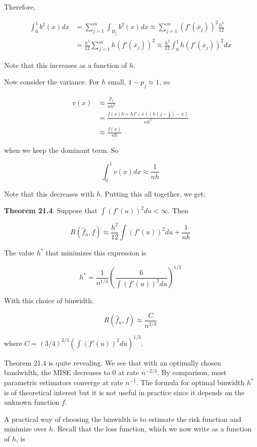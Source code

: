 Therefore,

\begin{align*}
\int_{0}^{1} b^{2}(x) dx &= \sum_{j=1}^m \int_{B_{j}} b^{2}(x) dx \approx \sum_{j=1}^m (f'(\overline{x}_{j}))^{2} \frac{h^{3}}{12} \\
&= \frac{h^{2}}{12} \sum_{j=1}^m h(f'(\overline{x}_{j}))^{2} \approx \frac{h^{2}}{12} \int_{0}^{1} h(f'(\overline{x}_{j}))^{2} dx
\end{align*}

Note that this increases as a function of \(h\).

Now consider the variance. For \(h\) small, \(1 - p_{j} \approx 1\), so

\begin{align*}
v(x) &\approx \frac{p_{j}}{nh^{2}}\\
&= \frac{f(x)h + h f'(x)\left(h \left(j - \frac{1}{2} \right) - x \right)}{nh^{2}} \\
&\approx \frac{f(x)}{nh}
\end{align*}

when we keep the dominant term. So

\[
\int_{0}^{1} v(x) dx \approx \frac{1}{nh}
\]

Note that this decreases with \(h\). Putting this all together, we get:

\textbf{Theorem 21.4}. Suppose that \(\int (f'(u))^{2} du < \infty\). Then

\[ R(\hat{f}_{n}, f) \approx \frac{h^{2}}{12} \int (f'(u))^{2} du + \frac{1}{nh}\]

The value \(h^*\) that minimizes this expression is

\[ h^* = \frac{1}{n^{1/3}} \left( \frac{6}{\int (f'(u))^{2} du} \right)^{1/3}\]

With this choice of binwidth,

\[ R(\hat{f}_{n}, f) \approx \frac{C}{n^{2/3}} \]

where \(C = (3/4)^{2/3} \left( \int (f'(u))^{2} du \right)^{1/3}\).

Theorem 21.4 is quite revealing. We see that with an optimally chosen
bandwidth, the MISE decreases to 0 at rate \(n^{-2/3}\). By comparison,
most parametric estimators converge at rate \(n^{-1}\). The formula for
optimal binwidth \(h^*\) is of theoretical interest but it is not useful
in practice since it depends on the unknown function \(f\).

A practical way of choosing the binwidth is to estimate the risk
function and minimize over \(h\). Recall that the loss function, which
we now write as a function of \(h\), is


